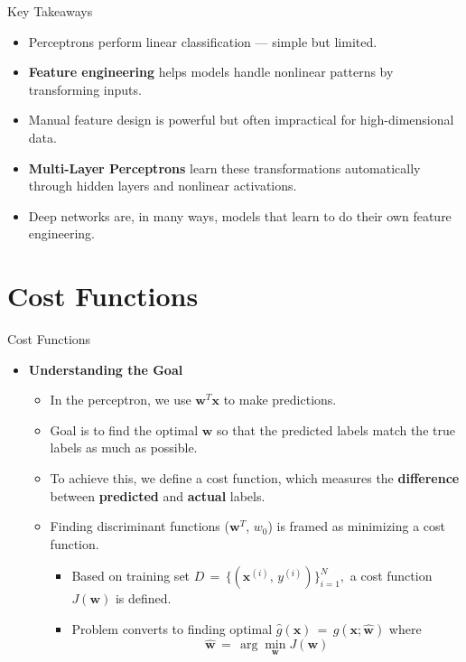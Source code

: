 \documentclass[serif, aspectratio=169]{beamer}
\begin{document}
    \begin{frame}{Key Takeaways}
        \begin{itemize}\itemsep1em
        \item Perceptrons perform linear classification — simple but limited.
        \item \textbf{Feature engineering} helps models handle nonlinear patterns by transforming inputs.
        \item Manual feature design is powerful but often impractical for high-dimensional data.
        \item \textbf{Multi-Layer Perceptrons} learn these transformations automatically through hidden layers and nonlinear activations.
        \item Deep networks are, in many ways, models that learn to do their own feature engineering.
        \end{itemize}
    \end{frame}


    \section{Cost Functions}


    \begin{frame}{Cost Functions}
        \begin{itemize}
            \item \textbf{Understanding the Goal}
            \medskip
            \begin{itemize}\itemsep1em
            \item In the perceptron, we use \( \mathbf{w}^T \mathbf{x} \) to make predictions.
            \item Goal is to find the optimal \(\mathbf{w}\) so that the predicted labels match the true labels as much as possible.
            \item To achieve this, we define a cost function, which measures the \textbf{difference} between \textbf{predicted} and \textbf{actual} labels.
            \item Finding discriminant functions (\(\mathbf{w}^T\), \(w_0\)) is framed as minimizing a cost function.
            \smallskip
            \begin{itemize}\itemsep0.8em
            \item Based on training set \(D \, = \, \{(\mathbf{x}^{(i)},\, y^{(i)})\}^N_{i=1},\) a cost function \(J(\mathbf{w})\) is defined.
            \item Problem converts to finding optimal \(\hat{g}(\mathbf{x}) \, = \, g(\mathbf{x; \hat{w}})\) where \[\mathbf{\hat{w}} \, = \, \arg \min_{\mathbf{w}}J(\mathbf{w})\]
            \end{itemize}
            \end{itemize}
        \end{itemize}
    \end{frame}
\end{document}
